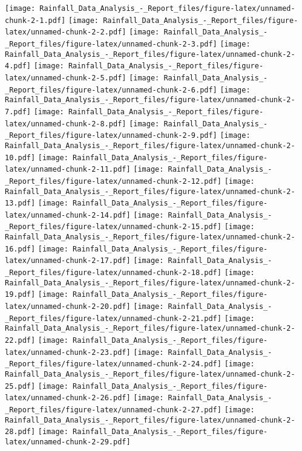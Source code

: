 \documentclass[
]{article}
\begin{document}
\texttt{[image: Rainfall\_Data\_Analysis\_-\_Report\_files/figure-latex/unnamed-chunk-2-1.pdf]}
\texttt{[image: Rainfall\_Data\_Analysis\_-\_Report\_files/figure-latex/unnamed-chunk-2-2.pdf]}
\texttt{[image: Rainfall\_Data\_Analysis\_-\_Report\_files/figure-latex/unnamed-chunk-2-3.pdf]}
\texttt{[image: Rainfall\_Data\_Analysis\_-\_Report\_files/figure-latex/unnamed-chunk-2-4.pdf]}
\texttt{[image: Rainfall\_Data\_Analysis\_-\_Report\_files/figure-latex/unnamed-chunk-2-5.pdf]}
\texttt{[image: Rainfall\_Data\_Analysis\_-\_Report\_files/figure-latex/unnamed-chunk-2-6.pdf]}
\texttt{[image: Rainfall\_Data\_Analysis\_-\_Report\_files/figure-latex/unnamed-chunk-2-7.pdf]}
\texttt{[image: Rainfall\_Data\_Analysis\_-\_Report\_files/figure-latex/unnamed-chunk-2-8.pdf]}
\texttt{[image: Rainfall\_Data\_Analysis\_-\_Report\_files/figure-latex/unnamed-chunk-2-9.pdf]}
\texttt{[image: Rainfall\_Data\_Analysis\_-\_Report\_files/figure-latex/unnamed-chunk-2-10.pdf]}
\texttt{[image: Rainfall\_Data\_Analysis\_-\_Report\_files/figure-latex/unnamed-chunk-2-11.pdf]}
\texttt{[image: Rainfall\_Data\_Analysis\_-\_Report\_files/figure-latex/unnamed-chunk-2-12.pdf]}
\texttt{[image: Rainfall\_Data\_Analysis\_-\_Report\_files/figure-latex/unnamed-chunk-2-13.pdf]}
\texttt{[image: Rainfall\_Data\_Analysis\_-\_Report\_files/figure-latex/unnamed-chunk-2-14.pdf]}
\texttt{[image: Rainfall\_Data\_Analysis\_-\_Report\_files/figure-latex/unnamed-chunk-2-15.pdf]}
\texttt{[image: Rainfall\_Data\_Analysis\_-\_Report\_files/figure-latex/unnamed-chunk-2-16.pdf]}
\texttt{[image: Rainfall\_Data\_Analysis\_-\_Report\_files/figure-latex/unnamed-chunk-2-17.pdf]}
\texttt{[image: Rainfall\_Data\_Analysis\_-\_Report\_files/figure-latex/unnamed-chunk-2-18.pdf]}
\texttt{[image: Rainfall\_Data\_Analysis\_-\_Report\_files/figure-latex/unnamed-chunk-2-19.pdf]}
\texttt{[image: Rainfall\_Data\_Analysis\_-\_Report\_files/figure-latex/unnamed-chunk-2-20.pdf]}
\texttt{[image: Rainfall\_Data\_Analysis\_-\_Report\_files/figure-latex/unnamed-chunk-2-21.pdf]}
\texttt{[image: Rainfall\_Data\_Analysis\_-\_Report\_files/figure-latex/unnamed-chunk-2-22.pdf]}
\texttt{[image: Rainfall\_Data\_Analysis\_-\_Report\_files/figure-latex/unnamed-chunk-2-23.pdf]}
\texttt{[image: Rainfall\_Data\_Analysis\_-\_Report\_files/figure-latex/unnamed-chunk-2-24.pdf]}
\texttt{[image: Rainfall\_Data\_Analysis\_-\_Report\_files/figure-latex/unnamed-chunk-2-25.pdf]}
\texttt{[image: Rainfall\_Data\_Analysis\_-\_Report\_files/figure-latex/unnamed-chunk-2-26.pdf]}
\texttt{[image: Rainfall\_Data\_Analysis\_-\_Report\_files/figure-latex/unnamed-chunk-2-27.pdf]}
\texttt{[image: Rainfall\_Data\_Analysis\_-\_Report\_files/figure-latex/unnamed-chunk-2-28.pdf]}
\texttt{[image: Rainfall\_Data\_Analysis\_-\_Report\_files/figure-latex/unnamed-chunk-2-29.pdf]}
\end{document}

